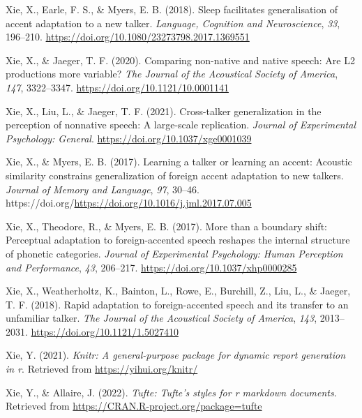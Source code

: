 \documentclass[
  11pt,
  english,
  man,floatsintext]{apa6}
\newlength{\cslhangindent}
\newlength{\cslentryspacingunit} %
\newenvironment{CSLReferences}[2] %
 {%
  \setlength{\parindent}{0pt}
  \ifodd #1
  \let\oldpar\par
  \def\par{\hangindent=\cslhangindent\oldpar}
  \fi
  \setlength{\parskip}{#2\cslentryspacingunit}
 }%
 {}
\begin{document}
\begin{CSLReferences}{1}{0}
\leavevmode{}%
Xie, X., Earle, F. S., \& Myers, E. B. (2018). Sleep facilitates generalisation of accent adaptation to a new talker. \emph{Language, Cognition and Neuroscience}, \emph{33}, 196--210. \url{https://doi.org/10.1080/23273798.2017.1369551}

\leavevmode{}%
Xie, X., \& Jaeger, T. F. (2020). Comparing non-native and native speech: Are L2 productions more variable? \emph{The Journal of the Acoustical Society of America}, \emph{147}, 3322--3347. \url{https://doi.org/10.1121/10.0001141}

\leavevmode{}%
Xie, X., Liu, L., \& Jaeger, T. F. (2021). Cross-talker generalization in the perception of nonnative speech: A large-scale replication. \emph{Journal of Experimental Psychology: General}. \url{https://doi.org/10.1037/xge0001039}

\leavevmode{}%
Xie, X., \& Myers, E. B. (2017). Learning a talker or learning an accent: Acoustic similarity constrains generalization of foreign accent adaptation to new talkers. \emph{Journal of Memory and Language}, \emph{97}, 30--46. https://doi.org/\url{https://doi.org/10.1016/j.jml.2017.07.005}

\leavevmode{}%
Xie, X., Theodore, R., \& Myers, E. B. (2017). More than a boundary shift: Perceptual adaptation to foreign-accented speech reshapes the internal structure of phonetic categories. \emph{Journal of Experimental Psychology: Human Perception and Performance}, \emph{43}, 206--217. \url{https://doi.org/10.1037/xhp0000285}

\leavevmode{}%
Xie, X., Weatherholtz, K., Bainton, L., Rowe, E., Burchill, Z., Liu, L., \& Jaeger, T. F. (2018). Rapid adaptation to foreign-accented speech and its transfer to an unfamiliar talker. \emph{The Journal of the Acoustical Society of America}, \emph{143}, 2013--2031. \url{https://doi.org/10.1121/1.5027410}

\leavevmode{}%
Xie, Y. (2021). \emph{Knitr: A general-purpose package for dynamic report generation in r}. Retrieved from \url{https://yihui.org/knitr/}

\leavevmode{}%
Xie, Y., \& Allaire, J. (2022). \emph{Tufte: Tufte's styles for r markdown documents}. Retrieved from \url{https://CRAN.R-project.org/package=tufte}


\end{CSLReferences}
\end{document}
